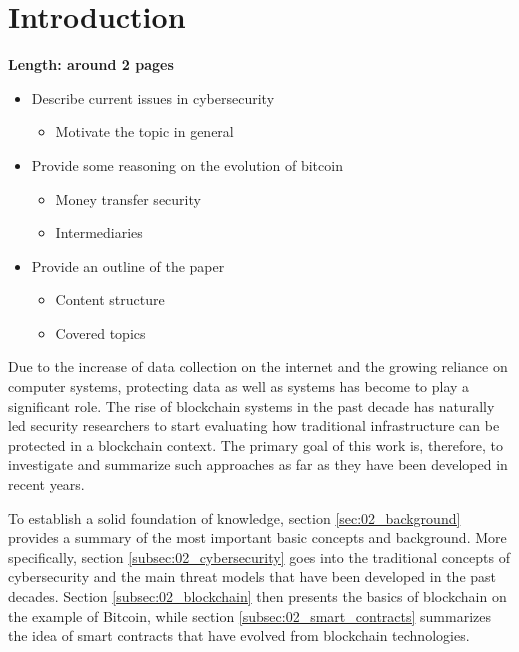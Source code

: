 \section{Introduction}

\textbf{Length: around 2 pages}

\begin{itemize}
  \item Describe current issues in cybersecurity
        \begin{itemize}
          \item Motivate the topic in general
        \end{itemize}
  \item Provide some reasoning on the evolution of bitcoin
        \begin{itemize}
          \item Money transfer security
          \item Intermediaries
        \end{itemize}
  \item Provide an outline of the paper
        \begin{itemize}
          \item Content structure
          \item Covered topics
        \end{itemize}
\end{itemize}

Due to the increase of data collection on the internet and the growing reliance on computer systems, protecting data as well as systems has become to play a significant role. The rise of blockchain systems in the past decade has naturally led security researchers to start evaluating how traditional infrastructure can be protected in a blockchain context. The primary goal of this work is, therefore, to investigate and summarize such approaches as far as they have been developed in recent years.

To establish a solid foundation of knowledge, section \ref{sec:02_background} provides a summary of the most important basic concepts and background. More specifically, section \ref{subsec:02_cybersecurity} goes into the traditional concepts of cybersecurity and the main threat models that have been developed in the past decades. Section \ref{subsec:02_blockchain} then presents the basics of blockchain on the example of Bitcoin, while section \ref{subsec:02_smart_contracts} summarizes the idea of smart contracts that have evolved from blockchain technologies.

